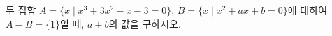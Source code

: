 두 집합 $A=\{x \mid x^3+3x^2-x-3=0\}$, $B=\{x \mid x^2+ax+b=0\}$에 대하여 $A-B=\{1\}$일 때, $a+b$의 값을 구하시오. 
